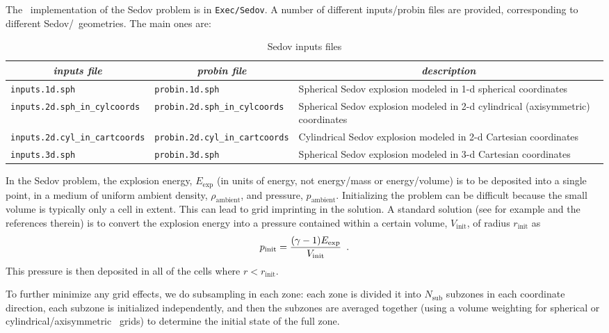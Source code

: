 The \castro\ implementation of the Sedov problem is in {\tt Exec/Sedov}.
A number of different inputs/probin files are provided, corresponding
to different Sedov/\castro\ geometries.  The main ones are:

\begin{table}[h]
\centering
{\small
\begin{tabular}{|l|l|p{2.25in}|} \hline
\multicolumn{1}{|c}{\em inputs file} &  \multicolumn{1}{|c}{\em probin file} & \multicolumn{1}{|c|}{\em description} \\
\hline
{\tt inputs.1d.sph} & {\tt probin.1d.sph} & Spherical Sedov explosion modeled in 1-d spherical coordinates \\[2mm]
%
{\tt inputs.2d.sph\_in\_cylcoords} & {\tt probin.2d.sph\_in\_cylcoords} & Spherical Sedov explosion modeled in 2-d cylindrical (axisymmetric) coordinates \\[2mm]
%
{\tt inputs.2d.cyl\_in\_cartcoords} & {\tt probin.2d.cyl\_in\_cartcoords} & Cylindrical Sedov explosion modeled in 2-d Cartesian coordinates \\[2mm]
%
{\tt inputs.3d.sph} & {\tt probin.3d.sph} & Spherical Sedov explosion modeled in 3-d Cartesian coordinates \\
\hline
\end{tabular}
\caption{\label{table:sedov_inputs} Sedov inputs files}
} %
\label{Table:Sod}
\end{table}

In the Sedov problem, the explosion energy, $E_\mathrm{exp}$ (in units 
of energy, not energy/mass or energy/volume)
is to be deposited into a single point, in a medium of uniform ambient
density, $\rho_\mathrm{ambient}$, and pressure, $p_\mathrm{ambient}$.
Initializing the problem can be difficult because the small volume is
typically only a cell in extent.  This can lead to grid imprinting in
the solution.  A standard solution (see for example \cite{omang:2006}
and the references therein)
is to convert the explosion energy into a pressure contained within a
certain volume, $V_\mathrm{init}$, of radius $r_\mathrm{init}$ as
\begin{equation}
p_\mathrm{init} = \frac{(\gamma - 1) E_\mathrm{exp}}{V_\mathrm{init}} \enskip .
\end{equation}
This pressure is then deposited in all of the cells where $r <
r_\mathrm{init}$.  

To further minimize any grid effects, we do subsampling
in each zone: each zone is divided it into $N_\mathrm{sub}$ subzones in each
coordinate direction, each subzone is initialized independently, and
then the subzones are averaged together (using a volume weighting for
spherical or cylindrical/axisymmetric \castro\ grids) to determine the
initial state of the full zone.

